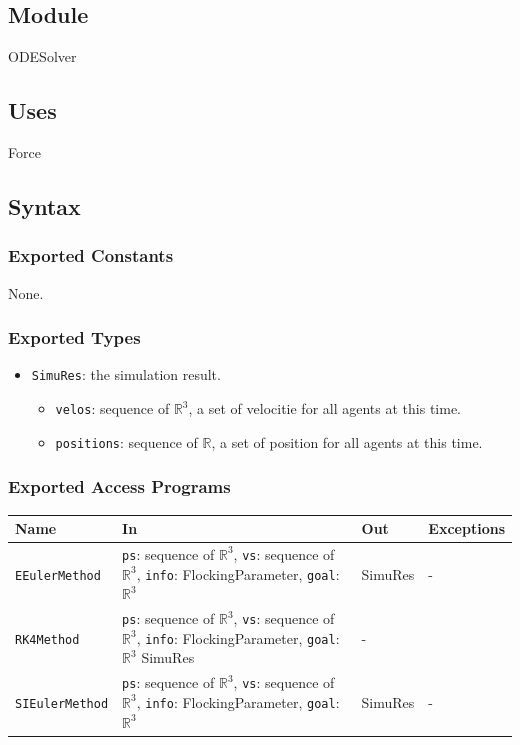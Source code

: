 \documentclass[12pt, titlepage]{article}
\begin{document}
\subsection{Module}

ODESolver

\subsection{Uses}

Force

\subsection{Syntax}

\subsubsection{Exported Constants}

None.

\subsubsection{Exported Types}

\begin{itemize}
\item \texttt{SimuRes}: the simulation result.
\begin{itemize}
  \item \texttt{velos}: sequence of $\mathbb{R}^3$, a set of velocitie for all 
  agents at this time.
  \item \texttt{positions}: sequence of $\mathbb{R}$, a set of position for all 
  agents at this time.
\end{itemize}
\end{itemize}

\subsubsection{Exported Access Programs}

\begin{center}
\begin{tabular}{p{4cm} p{4cm} p{4cm} p{2cm}}
\hline
\textbf{Name} & \textbf{In} & \textbf{Out} & \textbf{Exceptions} \\
\hline
\texttt{EEulerMethod} & \texttt{ps}: sequence of $\mathbb{R}^3$, 
\texttt{vs}: sequence of $\mathbb{R}^3$, \texttt{info}: FlockingParameter, 
\texttt{goal}: $\mathbb{R}^3$ & SimuRes & - \\
\texttt{RK4Method} & \texttt{ps}: sequence of $\mathbb{R}^3$, 
\texttt{vs}: sequence of $\mathbb{R}^3$, \texttt{info}: FlockingParameter, 
\texttt{goal}: $\mathbb{R}^3$ SimuRes & - \\
\texttt{SIEulerMethod} & \texttt{ps}: sequence of $\mathbb{R}^3$, 
\texttt{vs}: sequence of $\mathbb{R}^3$, \texttt{info}: FlockingParameter, 
\texttt{goal}: $\mathbb{R}^3$& SimuRes & - \\
\hline
\end{tabular}
\end{center}
\end{document}
